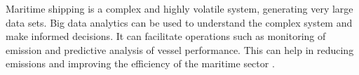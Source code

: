 Maritime shipping is a complex and highly volatile system, generating very large data sets.
Big data analytics can be used to understand the complex system and make informed decisions.
It can facilitate operations such as monitoring of emission and predictive analysis of vessel performance.
This can help in reducing emissions and improving the efficiency of the maritime sector \autocite{ZAMAN2017537}.







